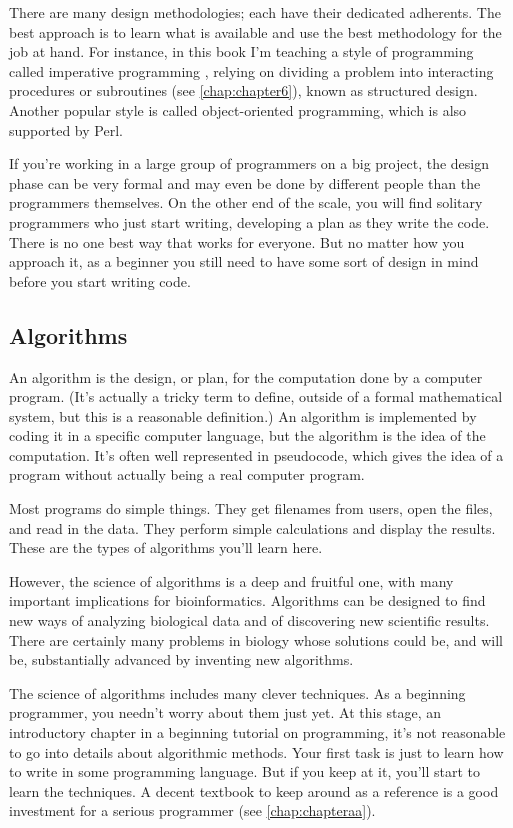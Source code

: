 There are many design methodologies; each have their dedicated adherents. The best approach is to learn what is available and use the best methodology for the job at hand. For instance, in this book I'm teaching a style of programming called imperative programming , relying on dividing a problem into interacting procedures or subroutines (see \ref{chap:chapter6}), known as structured design. Another popular style is called object-oriented programming, which is also supported by Perl.

If you're working in a large group of programmers on a big project, the design phase can be very formal and may even be done by different people than the programmers themselves. On the other end of the scale, you will find solitary programmers who just start writing, developing a plan as they write the code. There is no one best way that works for everyone.  But no matter how you approach it, as a beginner you still need to have some sort of design in mind before you start writing code. 

\subsection{Algorithms}
An algorithm is the design, or plan, for the computation done by a computer program. (It's actually a tricky term to define, outside of a formal mathematical system, but this is a reasonable definition.) An algorithm is implemented by coding it in a specific computer language, but the algorithm is the idea of the computation. It's often well represented in pseudocode, which gives the idea of a program without actually being a real computer program.

Most programs do simple things. They get filenames from users, open the files, and read in the data. They perform simple calculations and display the results. These are the types of algorithms you'll learn here.

However, the science of algorithms is a deep and fruitful one, with many important implications for bioinformatics. Algorithms can be designed to find new ways of analyzing biological data and of discovering new scientific results. There are certainly many problems in biology whose solutions could be, and will be, substantially advanced by inventing new algorithms.

The science of algorithms includes many clever techniques. As a beginning programmer, you needn't worry about them just yet. At this stage, an introductory chapter in a beginning tutorial on programming, it's not reasonable to go into details about algorithmic methods. Your first task is just to learn how to write in some programming language.  But if you keep at it, you'll start to learn the techniques. A decent textbook to keep around as a reference is a good investment for a serious programmer (see \ref{chap:chapteraa}).

